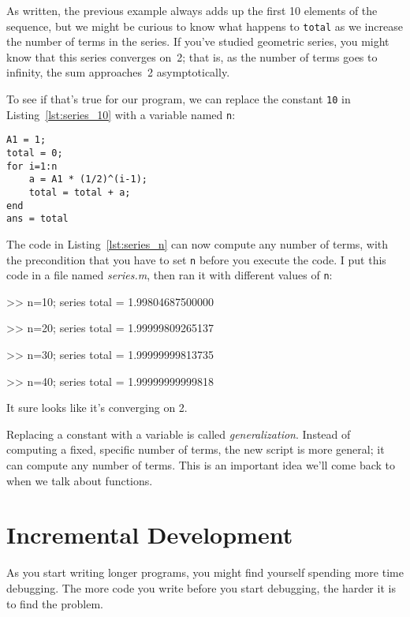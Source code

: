 
As written, the previous example always adds up the first 10
elements of the sequence, but we might be curious to know what
happens to \lstinline{total} as we increase the
number of terms in the series.  If you've studied geometric
series, you might know that this series converges on~2; that is,
as the number of terms goes to infinity, the sum approaches~2 asymptotically.

To see if that's true for our program, we can replace the
constant \lstinline{10} in Listing~\ref{lst:series_10} with a variable named \lstinline{n}:

\begin{lstlisting}[caption={Updating our code from Listing~\ref{lst:series_10} to have a variable number of terms}, label={lst:series_n}]
A1 = 1;
total = 0;
for i=1:n
    a = A1 * (1/2)^(i-1);
    total = total + a;
end
ans = total
\end{lstlisting}

The code in Listing~\ref{lst:series_n} can now compute any number of terms, with the
precondition that you have to set \lstinline{n} before you execute
the code.
I put this code in a file named \emph{series.m}, then
ran it with different values of \lstinline{n}:

\begin{code}
>> n=10; series
total = 1.99804687500000

>> n=20; series
total = 1.99999809265137

>> n=30; series
total = 1.99999999813735

>> n=40; series
total = 1.99999999999818
\end{code}

It sure looks like it's converging on 2.

Replacing a constant with a variable is called \emph{generalization}.
Instead of computing a fixed, specific number of terms, the new script
is more general; it can compute any number of terms.
This is an important idea we'll come back to when we talk about functions.

\section{Incremental Development}


As you start writing longer programs, you might find yourself spending more time debugging.
The more code you write before you start debugging, the harder it is to find
the problem.


